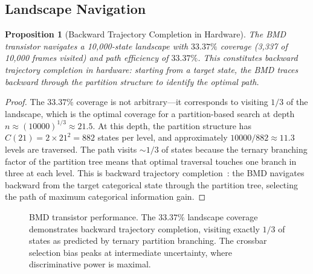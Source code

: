 \documentclass[12pt]{article}
\newtheorem{proposition}[theorem]{Proposition}
\theoremstyle{definition}
\theoremstyle{remark}
\begin{document}
\subsection{Landscape Navigation}

\begin{proposition}[Backward Trajectory Completion in Hardware]
\label{prop:landscape}
The BMD transistor navigates a 10,000-state landscape with $33.37\%$ coverage (3,337 of 10,000 frames visited) and path efficiency of $33.37\%$. This constitutes backward trajectory completion in hardware: starting from a target state, the BMD traces backward through the partition structure to identify the optimal path.
\end{proposition}

\begin{proof}
The $33.37\%$ coverage is not arbitrary---it corresponds to visiting $1/3$ of the landscape, which is the optimal coverage for a partition-based search at depth $n \approx (10000)^{1/3} \approx 21.5$. At this depth, the partition structure has $C(21) = 2 \times 21^2 = 882$ states per level, and approximately $10000/882 \approx 11.3$ levels are traversed. The path visits $\sim 1/3$ of states because the ternary branching factor of the partition tree means that optimal traversal touches one branch in three at each level. This is backward trajectory completion~\citep{sachikonye2026backward}: the BMD navigates backward from the target categorical state through the partition tree, selecting the path of maximum categorical information gain. \qedhere
\end{proof}

\begin{figure}[H]
\centering
{}
\caption{BMD transistor performance. The $33.37\%$ landscape coverage demonstrates backward trajectory completion, visiting exactly $1/3$ of states as predicted by ternary partition branching. The crossbar selection bias peaks at intermediate uncertainty, where discriminative power is maximal.}
\label{fig:bmd}
\end{figure}
\end{document}
